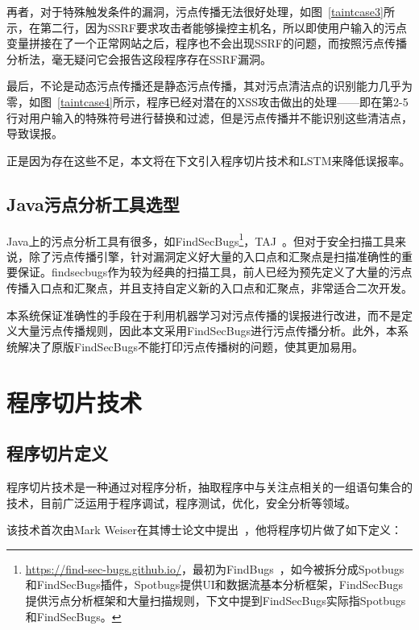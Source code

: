 再者，对于特殊触发条件的漏洞，污点传播无法很好处理，如图~\ref{taintcase3}所示，在第二行，因为SSRF要求攻击者能够操控主机名，所以即使用户输入的污点变量拼接在了一个正常网站之后，程序也不会出现SSRF的问题，而按照污点传播分析法，毫无疑问它会报告这段程序存在SSRF漏洞。

最后，不论是动态污点传播还是静态污点传播，其对污点清洁点的识别能力几乎为零，如图~\ref{taintcase4}所示，程序已经对潜在的XSS攻击做出的处理——即在第2-5行对用户输入的特殊符号进行替换和过滤，但是污点传播并不能识别这些清洁点，导致误报。    

正是因为存在这些不足，本文将在下文引入程序切片技术和LSTM来降低误报率。\\

\subsection{Java污点分析工具选型}
Java上的污点分析工具有很多，如FindSecBugs\footnote{\url{https://find-sec-bugs.github.io/}，最初为FindBugs~\cite{taint:finding}，如今被拆分成Spotbugs和FindSecBugs插件，Spotbugs提供UI和数据流基本分析框架，FindSecBugs提供污点分析框架和大量扫描规则，下文中提到FindSecBugs实际指Spotbugs和FindSecBugs。}，TAJ~\cite{taint:taj}。但对于安全扫描工具来说，除了污点传播引擎，针对漏洞定义好大量的入口点和汇聚点是扫描准确性的重要保证。findsecbugs作为较为经典的扫描工具，前人已经为预先定义了大量的污点传播入口点和汇聚点，并且支持自定义新的入口点和汇聚点，非常适合二次开发。

本系统保证准确性的手段在于利用机器学习对污点传播的误报进行改进，而不是定义大量污点传播规则，因此本文采用FindSecBugs进行污点传播分析。此外，本系统解决了原版FindSecBugs不能打印污点传播树的问题，使其更加易用。\\

\section{程序切片技术}
\subsection{程序切片定义}
程序切片技术是一种通过对程序分析，抽取程序中与关注点相关的一组语句集合的技术，目前广泛运用于程序调试，程序测试，优化，安全分析等领域。

该技术首次由Mark Weiser在其博士论文中提出~\cite{slices:weiser1979}，他将程序切片做了如下定义：

